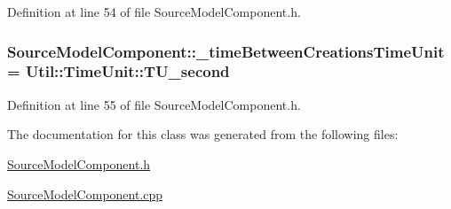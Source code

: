 Definition at line 54 of file Source\-Model\-Component.\-h.

\hypertarget{class_source_model_component_af34df20551bc223eb103ca87e9f1463e}{
\subsubsection[{\-\_\-time\-Between\-Creations\-Time\-Unit}]{ Source\-Model\-Component\-::\-\_\-time\-Between\-Creations\-Time\-Unit = Util\-::\-Time\-Unit\-::\-T\-U\-\_\-second\hspace{0.3cm}{\ttfamily [protected]}}}\label{class_source_model_component_af34df20551bc223eb103ca87e9f1463e}


Definition at line 55 of file Source\-Model\-Component.\-h.



The documentation for this class was generated from the following files\-:\begin{DoxyCompactItemize}
\item 
\hyperlink{_source_model_component_8h}{Source\-Model\-Component.\-h}\item 
\hyperlink{_source_model_component_8cpp}{Source\-Model\-Component.\-cpp}\end{DoxyCompactItemize}
